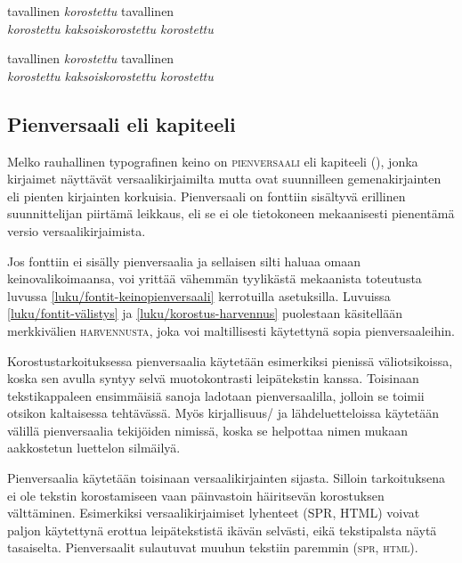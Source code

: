 \begin{koodilohkosis}
tavallinen \emph{korostettu} tavallinen \\
\emph{korostettu \emph{kaksoiskorostettu} korostettu}
\end{koodilohkosis}

\begin{tulossis}
  tavallinen \emph{korostettu} tavallinen \\
  \emph{korostettu \emph{kaksoiskorostettu} korostettu}
\end{tulossis}

\subsection{Pienversaali eli kapiteeli}
\label{luku/korostus-pienversaali}

Melko rauhallinen typografinen keino on \textsc{pienversaali} eli
kapiteeli (), jonka kirjaimet näyttävät
versaalikirjaimilta mutta ovat suunnilleen gemenakirjainten eli pienten
kirjainten korkuisia. Pienversaali on fonttiin sisältyvä erillinen
suunnittelijan piirtämä leikkaus, eli se ei ole tietokoneen mekaanisesti
pienentämä versio versaalikirjaimista.

Jos fonttiin ei sisälly pienversaalia ja sellaisen silti haluaa omaan
keinovalikoimaansa, voi yrittää vähemmän tyylikästä mekaanista
toteutusta luvussa \ref{luku/fontit-keinopienversaali} kerrotuilla
asetuksilla. Luvuissa \ref{luku/fontit-välistys} ja
\ref{luku/korostus-harvennus} puolestaan käsitellään merkkivälien
{\scshape{} harvennusta}, joka voi
maltillisesti käytettynä sopia pienversaaleihin.

Korostustarkoituksessa pienversaalia käytetään esimerkiksi pienissä
väliotsikoissa, koska sen avulla syntyy selvä muotokontrasti
leipätekstin kanssa. Toisinaan tekstikappaleen ensimmäisiä sanoja
ladotaan pienversaalilla, jolloin se toimii otsikon kaltaisessa
tehtävässä. Myös kirjallisuus\-/{} ja lähdeluetteloissa käytetään
välillä pienversaalia tekijöiden nimissä, koska se helpottaa nimen
mukaan aakkostetun luettelon silmäilyä.

Pienversaalia käytetään toisinaan versaalikirjainten sijasta. Silloin
tarkoituksena ei ole tekstin korostamiseen vaan päinvastoin häiritsevän
korostuksen välttäminen. Esimerkiksi versaalikirjaimiset lyhenteet (SPR,
HTML) voivat paljon käytettynä erottua leipätekstistä ikävän selvästi,
eikä tekstipalsta näytä tasaiselta. Pienversaalit sulautuvat muuhun
tekstiin paremmin (\textsc{spr}, \textsc{html}).

